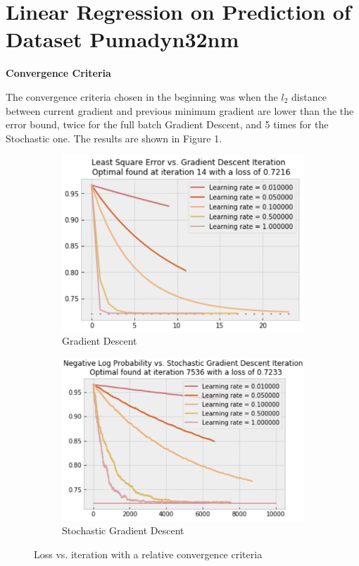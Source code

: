 \documentclass{article} %
\begin{document}
\vspace{0.3cm}
\section*{Linear Regression on Prediction of Dataset Pumadyn32nm} %

\textbf{Convergence Criteria}

  The convergence criteria chosen in the beginning was when the $l_2$ distance between current gradient and previous minimum gradient are lower than the the error bound, twice for the full batch Gradient Descent, and 5 times for the Stochastic one. The results are shown in Figure 1.
  \begin{figure}[!hb]
    \centering
    \begin{subfigure}[b]{0.42\linewidth}
      \includegraphics[width=\linewidth]{A3_1_1.png}
      \caption{Gradient Descent}
    \end{subfigure}
    \begin{subfigure}[b]{0.45\linewidth}
      \includegraphics[width=\linewidth]{A3_1_2.png}
      \caption{Stochastic Gradient Descent}
    \end{subfigure}
    \caption{Loss vs. iteration with a relative convergence criteria}
    \label{fig:Q1_1}
  \end{figure}
\end{document}
